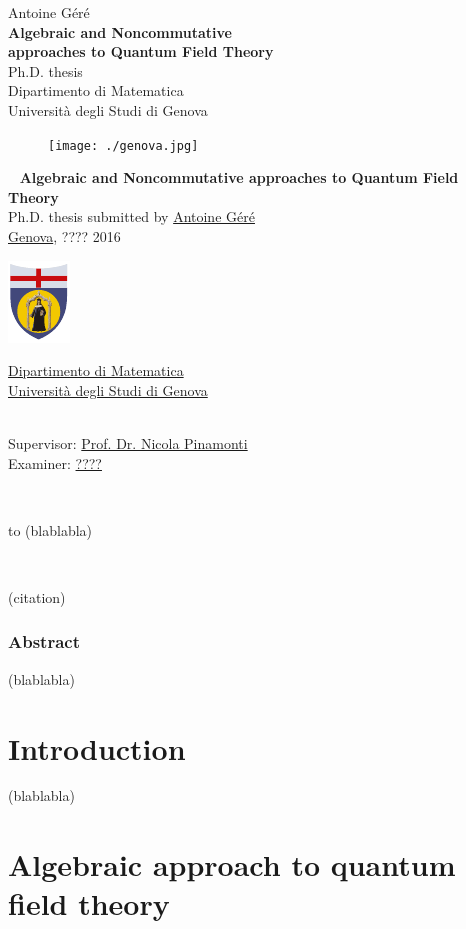 \documentclass[10pt]{book}
\makeatletter
\newcommand*{\makepagetitle}{%
%
{\raggedright%
%
%
%
%
\thispagestyle{empty}%
%
\vspace*{50pt}
%
{\LARGE Antoine Géré}\\%
%
\vspace*{120pt}%
%
{\Huge\bfseries Algebraic and Noncommutative \\[8pt] approaches to Quantum Field Theory}\\[\baselineskip]%
%
\vspace*{60pt}%
%
{\LARGE Ph.D. thesis}\\[\baselineskip]%
%
\vspace*{60pt}%
%
{\LARGE Dipartimento di Matematica}\\[\baselineskip]%
%
\vspace*{1pt}
%
{\LARGE Università degli Studi di Genova}\\[\baselineskip]%
%
\vfill%
%
\begin{figure}[b]
\centering
\texttt{[image: ./genova.jpg]}
\end{figure}
%
\vfill%
%
%
%
%
\newpage%
%
\thispagestyle{empty}%
%
\ \vfill%
%
%
\textbf{Algebraic and Noncommutative approaches to Quantum Field Theory} \\[2pt]
Ph.D. thesis submitted by \href{mailto:gere@dima.unige.it}{Antoine Géré} \\[1pt]
\href{http://www.comune.genova.it/}{Genova}, ???? 2016 \\[10pt]
%
%
\begin{minipage}{0.1\linewidth}
\includegraphics[scale=1]{unige.pdf}
\end{minipage}
%
\begin{minipage}{0.85\linewidth}
\href{http://www.dima.unige.it/}{Dipartimento di Matematica} \\[1pt]
\href{http://www.unige.it/}{Università degli Studi di Genova}
\end{minipage}
%
%
\vspace*{10pt} \\
Supervisor: \href{mailto:pinamont@dima.unige.it}{Prof. Dr. Nicola Pinamonti} \\[1pt]
%
Examiner: \href{mailto:????@????.com}{????}
%
%
%
%
%
}%
%
}%
\theoremstyle{break}
\makeatother
\begin{document}


\makepagetitle

\newpage


\ \vfill

\begin{flushright}
to (blablabla) 
\end{flushright}

\vfill


\newpage

\ \vfill

\begin{flushright}
(citation)
\end{flushright}

\vfill


\newpage

\vspace*{100pt}

\thispagestyle{empty}

\section*{Abstract}

(blablabla)


\tableofcontents


\part*{Introduction}


(blablabla)

\part{Algebraic approach to quantum field theory}
\end{document}
